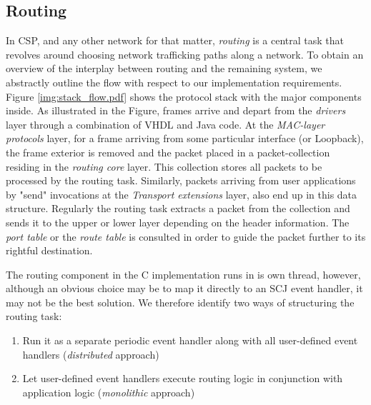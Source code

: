 \subsection{Routing}
In CSP, and any other network for that matter, \textit{routing} is a central task that revolves around choosing network trafficking paths along a network. To obtain an overview of the interplay between routing and the remaining system, we abstractly outline the flow with respect to our implementation requirements. Figure \ref{img:stack_flow.pdf} shows the protocol stack with the major components inside. As illustrated in the Figure, frames arrive and depart from the \textit{drivers} layer through a combination of VHDL and Java code. At the \textit{MAC-layer protocols} layer, for a frame arriving from some particular interface (\iic or Loopback), the frame exterior is removed and the packet placed in a packet-collection residing in the \textit{routing core} layer. This collection stores all packets to be processed by the routing task. Similarly, packets arriving from user applications by "send" invocations at the \textit{Transport extensions} layer, also end up in this data structure. Regularly the routing task extracts a packet from the collection and sends it to the upper or lower layer depending on the header information. The \textit{port table} or the \textit{route table} is consulted in order to guide the packet further to its rightful destination.

The routing component in the C implementation runs in is own thread, however, although an obvious choice may be to map it directly to an SCJ event handler, it may not be the best solution. We therefore identify two ways of structuring the routing task:

\begin{enumerate}
	\item Run it as a separate periodic event handler along with all user-defined event handlers (\textit{distributed} approach)
	\item Let user-defined event handlers execute routing logic in conjunction with application logic (\textit{monolithic} approach)
\end{enumerate}

